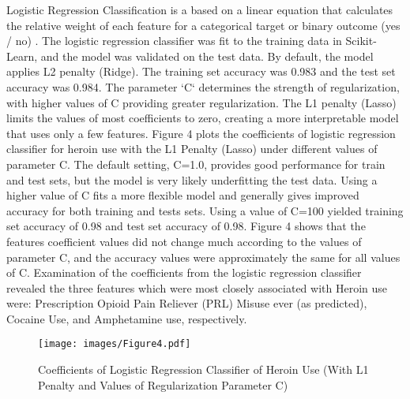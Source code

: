 \documentclass[sigconf]{acmart}
\begin{document}
Logistic Regression Classification is a based on a linear equation that 
calculates the relative weight of each feature for a categorical target or 
binary outcome (yes / no) \cite{raschka17}. The logistic regression classifier 
was fit to the training data in Scikit-Learn, and the model was validated on 
the test data. By default, the model applies L2 penalty (Ridge). The training 
set accuracy was 0.983 and the test set accuracy was 0.984. The parameter `C` 
determines the strength of regularization, with higher values of C providing
greater regularization. The L1 penalty (Lasso) limits the values of most 
coefficients to zero, creating a more interpretable model that uses only a 
few features. Figure 4 plots the coefficients of logistic regression classifier 
for heroin use with the L1 Penalty (Lasso) under different values of parameter 
C. The default setting, C=1.0, provides good performance for train and test 
sets, but the model is very likely underfitting the test data. Using a higher
value of C fits a more flexible model and generally gives improved accuracy 
for both training and tests sets. Using a value of C=100 yielded training set
accuracy of 0.98 and test set accuracy of 0.98. Figure 4 shows that the 
features coefficient values did not change much according to the values of
parameter C, and the accuracy values were approximately the same for all 
values of C. Examination of the coefficients from the logistic regression 
classifier revealed the three features which were most closely associated 
with Heroin use were: Prescription Opioid Pain Reliever (PRL) Misuse ever 
(as predicted), Cocaine Use, and Amphetamine use, respectively.

\begin{figure}[!ht]
  \centering\texttt{[image: images/Figure4.pdf]}
  \caption{Coefficients of Logistic Regression Classifier of Heroin Use 
  (With L1 Penalty and Values of Regularization Parameter C)}
  \label{f:Figure4}
\end{figure}
\end{document}
